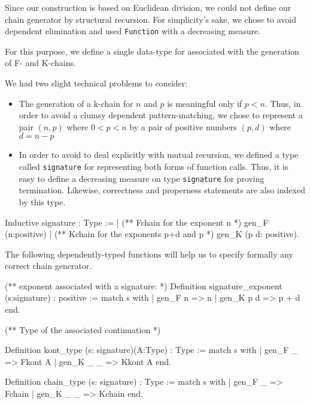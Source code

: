 Since our construction is based on Euclidean division, we could not
define our chain generator by structural recursion. 
For simplicity's sake, we chose to avoid dependent elimination
 and used \texttt{Function}  with a decreasing measure.

 For this purpose, we define a single data-type for associated with
 the generation of F- and K-chains.


We had two slight technical problems to consider:
\begin{itemize}
\item The generation of a k-chain for $n$ and $p$ is meaningful only if $p < n$. Thus, in order to avoid a clumsy  dependent pattern-matching, we chose to represent
     a pair $(n,p)$ where $0<p<n$ by a pair of positive numbers $(p,d)$ where 
     $d=n-p$
\item In order to avoid to deal explicitly with mutual recursion, we
     defined a type called \texttt{signature} for representing both
     forms of function calls.
     Thus, it is easy to define a decreasing measure on type 
     \texttt{signature} for proving termination. 
    Likewise, correctness and properness statements are also indexed by 
    this type.

\end{itemize}

\begin{Coqsrc}
Inductive signature : Type :=
|  (** Fchain for the exponent n *)
     gen_F (n:positive) 
| (** Kchain for the exponents p+d  and p *) 
     gen_K (p d: positive).
\end{Coqsrc}

The following dependently-typed functions will help us to specify  formally
any correct chain generator.

\begin{Coqsrc}
(** 
  exponent associated with a signature:
*)
Definition signature_exponent (s:signature) : positive :=
 match s with 
| gen_F n => n 
| gen_K p d  =>  p + d
end.
\end{Coqsrc}



\begin{Coqsrc}
(**
Type of the associated continuation 
*)

Definition kont_type (s: signature)(A:Type) : Type :=
match s with 
| gen_F _  => Fkont A 
| gen_K _ _   => Kkont A
end.

Definition chain_type (s: signature) : Type :=
 match s with 
| gen_F _   => Fchain
|  gen_K _ _  => Kchain
end.

\end{Coqsrc}

